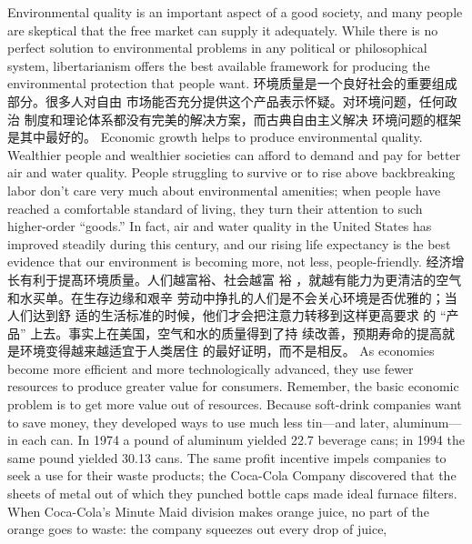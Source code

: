 \begin{paracol}{2}
Environmental quality is an important aspect of a good society,
and many people are skeptical that the free market can supply
it adequately. While there is no perfect solution to environmental problems in any political or philosophical system, libertarianism offers the best available framework for producing the
environmental protection that people want.
\switchcolumn
环境质量是一个良好社会的重要组成部分。很多人对自由
市场能否充分提供这个产品表示怀疑。对环境问题，任何政治
制度和理论体系都没有完美的解决方案，而古典自由主义解决
环境问题的框架是其中最好的。
\switchcolumn*
Economic growth helps to produce environmental quality. Wealthier people and wealthier societies can afford to demand
and pay for better air and water quality. People struggling to
survive or to rise above backbreaking labor don't care very
much about environmental amenities; when people have
reached a comfortable standard of living, they turn their attention to such higher-order ``goods.'' In fact, air and water quality
in the United States has improved steadily during this century,
and our rising life expectancy is the best evidence that our environment is becoming more, not less, people-friendly.
\switchcolumn
经济增长有利于提髙环境质量。人们越富裕、社会越富
裕 ，就越有能力为更清洁的空气和水买单。在生存边缘和艰辛
劳动中挣扎的人们是不会关心环境是否优雅的；当人们达到舒
适的生活标准的时候，他们才会把注意力转移到这样更高要求
的 “产品” 上去。事实上在美国，空气和水的质量得到了持
续改善，预期寿命的提高就是环境变得越来越适宜于人类居住
的最好证明，而不是相反。
\switchcolumn*
As economies become more efficient and more technologically advanced, they use fewer resources to produce greater
value for consumers. Remember, the basic economic problem is
to get more value out of resources. Because soft-drink companies want to save money, they developed ways to use much less
tin---and later, aluminum---in each can. In 1974 a pound of
aluminum yielded 22.7 beverage cans; in 1994 the same pound
yielded 30.13 cans. The same profit incentive impels companies
to seek a use for their waste products; the Coca-Cola Company
discovered that the sheets of metal out of which they punched
bottle caps made ideal furnace filters. When Coca-Cola's
Minute Maid division makes orange juice, no part of the orange
goes to waste: the company squeezes out every drop of juice,

\end{paracol}
